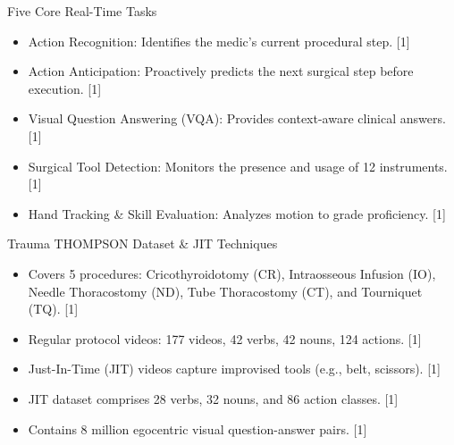 \documentclass[aspectratio=169, 10pt]{beamer}
\begin{document}
\begin{frame}{Five Core Real-Time Tasks}
    \vspace{0.3cm}
    \begin{itemize}
        \setlength{\itemsep}{8pt}
        \item Action Recognition: Identifies the medic's current procedural step. [1]
        \item Action Anticipation: Proactively predicts the next surgical step before execution. [1]
        \item Visual Question Answering (VQA): Provides context-aware clinical answers. [1]
        \item Surgical Tool Detection: Monitors the presence and usage of 12 instruments. [1]
        \item Hand Tracking \& Skill Evaluation: Analyzes motion to grade proficiency. [1]
    \end{itemize}
\end{frame}

\begin{frame}{Trauma THOMPSON Dataset \& JIT Techniques}
    \vspace{0.3cm}
    \begin{itemize}
        \setlength{\itemsep}{8pt}
        \item Covers 5 procedures: Cricothyroidotomy (CR), Intraosseous Infusion (IO), Needle Thoracostomy (ND), Tube Thoracostomy (CT), and Tourniquet (TQ). [1]
        \item Regular protocol videos: 177 videos, 42 verbs, 42 nouns, 124 actions. [1]
        \item Just-In-Time (JIT) videos capture improvised tools (e.g., belt, scissors). [1]
        \item JIT dataset comprises 28 verbs, 32 nouns, and 86 action classes. [1]
        \item Contains 8 million egocentric visual question-answer pairs. [1]
    \end{itemize}
\end{frame}
\end{document}
